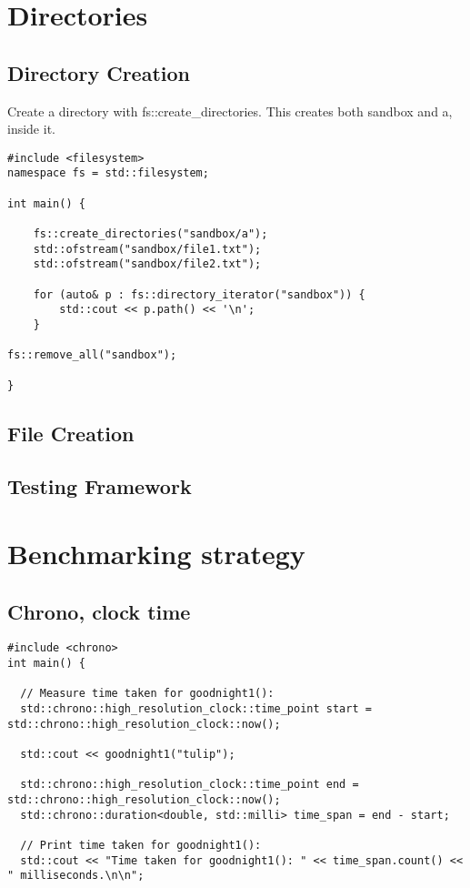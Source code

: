 \documentclass[openany]{report}
\begin{document}
\section{Directories}

\subsection{Directory Creation}

Create a directory with fs::create\_directories. This creates both sandbox and a, inside it.

\begin{verbatim}
#include <filesystem>
namespace fs = std::filesystem;

int main() {

    fs::create_directories("sandbox/a");
    std::ofstream("sandbox/file1.txt");
    std::ofstream("sandbox/file2.txt");

    for (auto& p : fs::directory_iterator("sandbox")) {
        std::cout << p.path() << '\n';
    } 

fs::remove_all("sandbox");

}
\end{verbatim}


\subsection{File Creation}



\subsection{Testing Framework}

\section{Benchmarking strategy}
\subsection{Chrono, clock time}

\begin{verbatim}
#include <chrono>
int main() {

  // Measure time taken for goodnight1():
  std::chrono::high_resolution_clock::time_point start = std::chrono::high_resolution_clock::now();

  std::cout << goodnight1("tulip");

  std::chrono::high_resolution_clock::time_point end = std::chrono::high_resolution_clock::now();
  std::chrono::duration<double, std::milli> time_span = end - start;

  // Print time taken for goodnight1():
  std::cout << "Time taken for goodnight1(): " << time_span.count() << " milliseconds.\n\n";
\end{verbatim}
\end{document}
